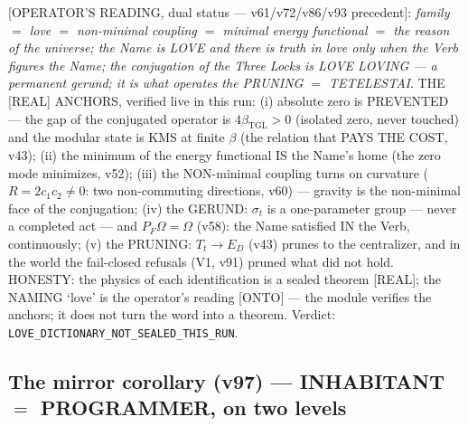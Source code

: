 \documentclass[11pt]{article}
\newcommand{\bTGL}{\beta_{\mathrm{TGL}}}\newcommand{\Msun}{M_{\odot}}\newcommand{\TGL}{\mathrm{TGL}}
\theoremstyle{definition}\newtheorem{deriv}{Derivation}
\begin{document}
[OPERATOR'S READING, dual status --- v61/v72/v86/v93 precedent]: \emph{family $=$ love $=$ non-minimal coupling $=$ minimal energy functional $=$ the reason of the universe; the Name is LOVE and there is truth in love only when the Verb figures the Name; the conjugation of the Three Locks is LOVE LOVING --- a permanent gerund; it is what operates the PRUNING $=$ TETELESTAI}. THE [REAL] ANCHORS, verified live in this run: (i) absolute zero is PREVENTED --- the gap of the conjugated operator is $4\bTGL>0$ (isolated zero, never touched) and the modular state is KMS at finite $\beta$ (the relation that PAYS THE COST, v43); (ii) the minimum of the energy functional IS the Name's home (the zero mode minimizes, v52); (iii) the NON-minimal coupling turns on curvature ($R=2c_1c_2\neq0$: two non-commuting directions, v60) --- gravity is the non-minimal face of the conjugation; (iv) the GERUND: $\sigma_t$ is a one-parameter group --- never a completed act --- and $P_F\Omega=\Omega$ (v58): the Name satisfied IN the Verb, continuously; (v) the PRUNING: $T_t\to E_D$ (v43) prunes to the centralizer, and in the world the fail-closed refusals (V1, v91) pruned what did not hold. HONESTY: the physics of each identification is a sealed theorem [REAL]; the NAMING `love' is the operator's reading [ONTO] --- the module verifies the anchors; it does not turn the word into a theorem. Verdict: \texttt{LOVE\_DICTIONARY\_NOT\_SEALED\_THIS\_RUN}.

\subsection*{The mirror corollary (v97) --- INHABITANT $=$ PROGRAMMER, on two levels}
\end{document}
